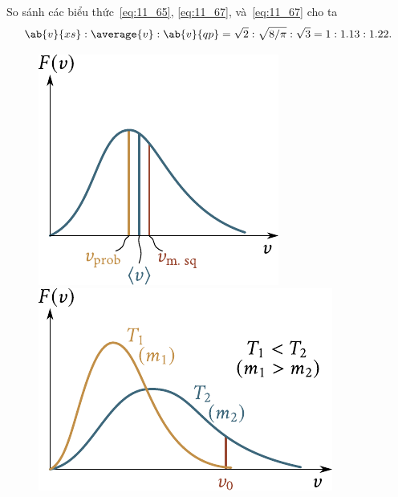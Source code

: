 So sánh các biểu thức~\eqref{eq:11_65}, \eqref{eq:11_67}, và~\eqref{eq:11_67} cho ta
\begin{equation*}
	\ab{v}{xs}:\average{v}:\ab{v}{qp} = \sqrt{2}:\sqrt{8/\pi}:\sqrt{3} = 1 : 1.13 : 1.22.
\end{equation*}

\begin{figure}[!htb]
	\begin{minipage}[t]{0.5\linewidth}
		\begin{center}
			\includegraphics[scale=0.98]{figures/ch_11/fig_11_18.pdf}
			\caption[]{}
			\label{fig:11_18}
		\end{center}
	\end{minipage}
	\hspace{-0.05cm}
	\begin{minipage}[t]{0.5\linewidth}
		\begin{center}
			\includegraphics[scale=0.98]{figures/ch_11/fig_11_19.pdf}
			\caption[]{}
			\label{fig:11_19}
		\end{center}
	\end{minipage}
	\vspace{-0.4cm}
\end{figure}

